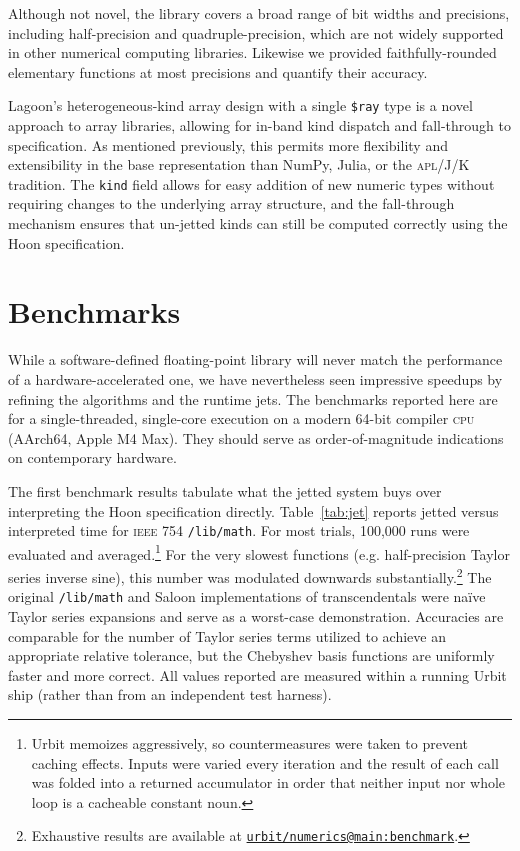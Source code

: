 \documentclass[twoside]{article}
\begin{document}
Although not novel, the library covers a broad range of bit widths and precisions, including half-precision and quadruple-precision, which are not widely supported in other numerical computing libraries.  Likewise we provided faithfully-rounded elementary functions at most precisions and quantify their accuracy.

Lagoon's heterogeneous-kind array design with a single \texttt{\$ray} type is a novel approach to array libraries, allowing for in-band kind dispatch and fall-through to specification.  As mentioned previously, this permits more flexibility and extensibility in the base representation than NumPy, Julia, or the \textsc{apl}/J/K tradition.  The \texttt{kind} field allows for easy addition of new numeric types without requiring changes to the underlying array structure, and the fall-through mechanism ensures that un-jetted kinds can still be computed correctly using the Hoon specification.

\section{Benchmarks}

While a software-defined floating-point library will never match the performance of a hardware-accelerated one, we have nevertheless seen impressive speedups by refining the algorithms and the runtime jets.  The benchmarks reported here are for a single-threaded, single-core execution on a modern 64-bit compiler \textsc{cpu} (AArch64, Apple M4 Max).  They should serve as order-of-magnitude indications on contemporary hardware.

The first benchmark results tabulate what the jetted system buys over interpreting the Hoon specification directly.  Table~\ref{tab:jet} reports jetted versus interpreted time for \textsc{ieee} 754 \texttt{/lib/math}.  For most trials, 100,000 runs were evaluated and averaged.\footnote{Urbit memoizes aggressively, so countermeasures were taken to prevent caching effects.  Inputs were varied every iteration and the result of each call was folded into a returned accumulator in order that neither input nor whole loop is a cacheable constant noun.}  For the very slowest functions (e.g. half-precision Taylor series inverse sine), this number was modulated downwards substantially.\footnote{Exhaustive results are available at \href{https://github.com/urbit/numerics/tree/main/benchmark}{\texttt{urbit/numerics@main:benchmark}}.}  The original \texttt{/lib/math} and Saloon implementations of transcendentals were na\"{i}ve Taylor series expansions and serve as a worst-case demonstration.  Accuracies are comparable for the number of Taylor series terms utilized to achieve an appropriate relative tolerance, but the Chebyshev basis functions are uniformly faster and more correct.  All values reported are measured within a running Urbit ship (rather than from an independent test harness).
\end{document}
